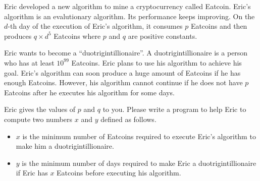 Eric developed a new algorithm to mine a cryptocurrency called 
Eatcoin. 
Eric's algorithm is an evalutionary algorithm.
Its performance keeps improving. 
On the $d$-th day of the execution of Eric's algorithm, 
it consumes $p$ Eatcoins and then
produces $q\times d^5$ Eatcoins where $p$ and $q$
are positive constants.

Eric wants to become a ``duotrigintillionaire''. 
A duotrigintillionaire is a person who has at least $10^{99}$ Eatcoins. 
Eric plans to use his algorithm to achieve his goal.
Eric's algorithm can soon produce a huge amount of Eatcoins if
he has enough Eatcoins.
However, his algorithm cannot continue if he does not have
$p$ Eatcoins after he executes his algorithm for some days.

Eric gives the values of $p$ and $q$ to you. Please write a program
to help Eric to compute two numbers $x$ and $y$ defined as follows.
\begin{itemize}
\item $x$ is the minimum number of Eatcoins required to execute Eric's 
algorithm to make him a duotrigintillionaire.
\item $y$ is the minimum number of days required to make Eric a 
duotrigintillionaire if Eric has $x$ Eatcoins before executing his algorithm.
\end{itemize}
